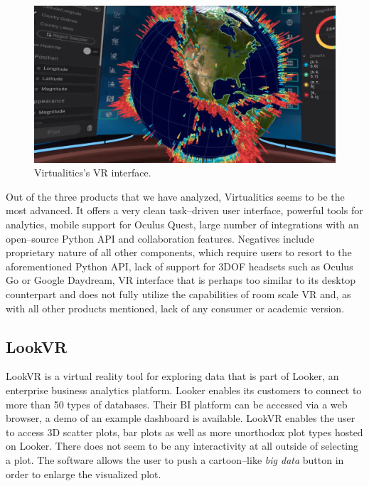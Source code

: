 \documentclass{article}
\begin{document}
\begin{figure}[!h]
\centering
\includegraphics[scale=0.18]{images/virtualitics_vr}
\caption{Virtualitics's VR interface.\cite{virtualiticsvideo}}
\label{fig:virtualiticsvr}
\end{figure}

Out of the three products that we have analyzed, Virtualitics seems to be the most advanced. It offers a very clean task--driven user interface, powerful tools for analytics, mobile support for Oculus Quest, large number of integrations with an open--source Python API and collaboration features. Negatives include proprietary nature of all other components, which require users to resort to the aforementioned Python API, lack of support for 3DOF headsets such as Oculus Go or Google Daydream, VR interface that is perhaps too similar to its desktop counterpart and does not fully utilize the capabilities of room scale VR and, as with all other products mentioned, lack of any consumer or academic version.

\subsection{LookVR}

LookVR is a virtual reality tool for exploring data that is part of Looker, an enterprise business analytics platform.\cite{lookvr} Looker enables its customers to connect to more than 50 types of databases. Their BI platform can be accessed via a web browser, a demo of an example dashboard is available.\cite{lookerdash} LookVR enables the user to access 3D scatter plots, bar plots as well as more unorthodox plot types hosted on Looker. There does not seem to be any interactivity at all outside of selecting a plot. The software allows the user to push a cartoon--like \emph{big data} button in order to enlarge the visualized plot.\\
\end{document}
